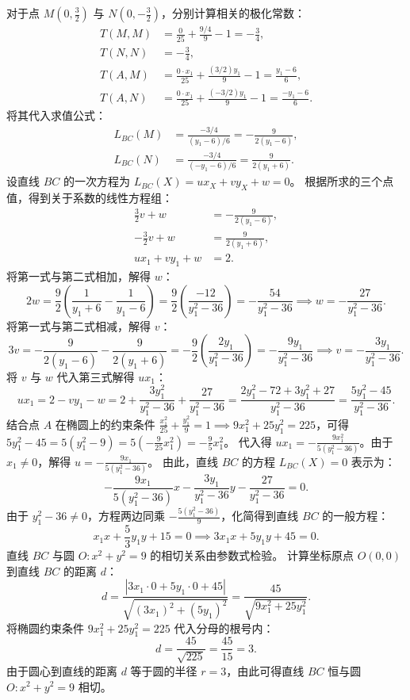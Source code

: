 \begin{solution}
对于点 $M\left(0, \frac{3}{2}\right)$ 与 $N\left(0, -\frac{3}{2}\right)$，分别计算相关的极化常数：
\begin{align*}
T(M, M) &= \frac{0}{25} + \frac{9/4}{9} - 1 = -\frac{3}{4}, \\
T(N, N) &= -\frac{3}{4}, \\
T(A, M) &= \frac{0 \cdot x_1}{25} + \frac{(3/2) y_1}{9} - 1 = \frac{y_1 - 6}{6}, \\
T(A, N) &= \frac{0 \cdot x_1}{25} + \frac{(-3/2) y_1}{9} - 1 = \frac{-y_1 - 6}{6}.
\end{align*}
将其代入求值公式：
\begin{align*}
L_{BC}(M) &= \frac{-3/4}{(y_1 - 6)/6} = -\frac{9}{2(y_1 - 6)}, \\
L_{BC}(N) &= \frac{-3/4}{(-y_1 - 6)/6} = \frac{9}{2(y_1 + 6)}.
\end{align*}
设直线 $BC$ 的一次方程为 $L_{BC}(X) = u x_X + v y_X + w = 0$。
根据所求的三个点值，得到关于系数的线性方程组：
\begin{align*}
\frac{3}{2} v + w &= -\frac{9}{2(y_1 - 6)}, \\
-\frac{3}{2} v + w &= \frac{9}{2(y_1 + 6)}, \\
u x_1 + v y_1 + w &= 2.
\end{align*}
将第一式与第二式相加，解得 $w$：
\[ 2w = \frac{9}{2} \left( \frac{1}{y_1 + 6} - \frac{1}{y_1 - 6} \right) = \frac{9}{2} \left( \frac{-12}{y_1^2 - 36} \right) = -\frac{54}{y_1^2 - 36} \implies w = -\frac{27}{y_1^2 - 36}. \]
将第一式与第二式相减，解得 $v$：
\[ 3v = -\frac{9}{2(y_1 - 6)} - \frac{9}{2(y_1 + 6)} = -\frac{9}{2} \left( \frac{2y_1}{y_1^2 - 36} \right) = -\frac{9y_1}{y_1^2 - 36} \implies v = -\frac{3y_1}{y_1^2 - 36}. \]
将 $v$ 与 $w$ 代入第三式解得 $u x_1$：
\[ u x_1 = 2 - v y_1 - w = 2 + \frac{3y_1^2}{y_1^2 - 36} + \frac{27}{y_1^2 - 36} = \frac{2y_1^2 - 72 + 3y_1^2 + 27}{y_1^2 - 36} = \frac{5y_1^2 - 45}{y_1^2 - 36}. \]
结合点 $A$ 在椭圆上的约束条件 $\frac{x_1^2}{25} + \frac{y_1^2}{9} = 1 \implies 9x_1^2 + 25y_1^2 = 225$，可得 $5y_1^2 - 45 = 5(y_1^2 - 9) = 5\left(-\frac{9}{25}x_1^2\right) = -\frac{9}{5}x_1^2$。
代入得 $u x_1 = -\frac{9x_1^2}{5(y_1^2 - 36)}$。由于 $x_1 \neq 0$，解得 $u = -\frac{9x_1}{5(y_1^2 - 36)}$。
由此，直线 $BC$ 的方程 $L_{BC}(X) = 0$ 表示为：
\[ -\frac{9x_1}{5(y_1^2 - 36)} x - \frac{3y_1}{y_1^2 - 36} y - \frac{27}{y_1^2 - 36} = 0. \]
由于 $y_1^2 - 36 \neq 0$，方程两边同乘 $-\frac{5(y_1^2 - 36)}{9}$，化简得到直线 $BC$ 的一般方程：
\[ x_1 x + \frac{5}{3} y_1 y + 15 = 0 \implies 3x_1 x + 5y_1 y + 45 = 0. \]
直线 $BC$ 与圆 $O: x^2 + y^2 = 9$ 的相切关系由参数式检验。
计算坐标原点 $O(0, 0)$ 到直线 $BC$ 的距离 $d$：
\[ d = \frac{|3x_1 \cdot 0 + 5y_1 \cdot 0 + 45|}{\sqrt{(3x_1)^2 + (5y_1)^2}} = \frac{45}{\sqrt{9x_1^2 + 25y_1^2}}. \]
将椭圆约束条件 $9x_1^2 + 25y_1^2 = 225$ 代入分母的根号内：
\[ d = \frac{45}{\sqrt{225}} = \frac{45}{15} = 3. \]
由于圆心到直线的距离 $d$ 等于圆的半径 $r = 3$，由此可得直线 $BC$ 恒与圆 $O: x^2 + y^2 = 9$ 相切。

\end{solution}

